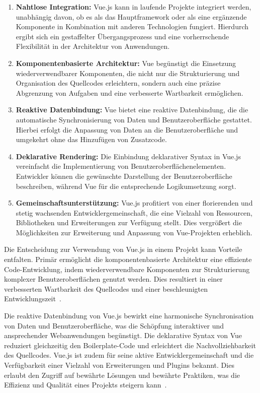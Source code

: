 \begin{enumerate}[itemsep=8pt, parsep=5pt]
    \item \textbf{Nahtlose Integration:} Vue.js kann  in laufende Projekte integriert werden, unabhängig davon,
ob es als das Hauptframework oder als eine ergänzende Komponente in Kombination mit anderen Technologien fungiert.
Hierdurch ergibt sich ein gestaffelter Übergangsprozess und eine vorherrschende Flexibilität in der Architektur von
Anwendungen.
    \item \textbf{Komponentenbasierte Architektur:} Vue begünstigt die Einsetzung wiederverwendbarer Komponenten, die
nicht nur die Strukturierung und Organisation des Quellcodes erleichtern, sondern auch eine präzise Abgrenzung von
Aufgaben und eine verbesserte Wartbarkeit ermöglichen.
    \item \textbf{Reaktive Datenbindung:} Vue bietet eine reaktive Datenbindung, die die automatische Synchronisierung
von Daten und Benutzeroberfläche gestattet. Hierbei erfolgt die Anpassung von Daten an die Benutzeroberfläche und
umgekehrt ohne das Hinzufügen von Zusatzcode.
    \item \textbf{Deklarative Rendering:} Die Einbindung deklarativer Syntax in Vue.js vereinfacht die Implementierung
von Benutzeroberflächenelementen. Entwickler können die gewünschte Darstellung der Benutzeroberfläche
beschreiben, während Vue für die entsprechende Logikumsetzung sorgt.
    \item \textbf{Gemeinschaftsunterstützung:} Vue.js profitiert von einer florierenden und stetig wachsenden
Entwicklergemeinschaft, die eine Vielzahl von Ressourcen, Bibliotheken und Erweiterungen zur Verfügung stellt. Dies
vergrößert die Möglichkeiten zur Erweiterung und Anpassung von Vue-Projekten erheblich.
\end{enumerate}

Die Entscheidung zur Verwendung von Vue.js in einem Projekt kann Vorteile entfalten. Primär ermöglicht
die komponentenbasierte Architektur eine effiziente Code-Entwicklung, indem wiederverwendbare Komponenten zur
Strukturierung komplexer Benutzeroberflächen genutzt werden. Dies resultiert in einer verbesserten Wartbarkeit des
Quellcodes und einer beschleunigten Entwicklungszeit~\cite{wohlgethan2018supportingweb}.

Die reaktive Datenbindung von Vue.js bewirkt eine harmonische Synchronisation von Daten und Benutzeroberfläche, was die
Schöpfung interaktiver und ansprechender Webanwendungen begünstigt. Die deklarative Syntax von Vue reduziert
gleichzeitig den Boilerplate-Code und erleichtert die Nachvollziehbarkeit des Quellcodes. Vue.js ist zudem für seine
aktive Entwicklergemeinschaft und die Verfügbarkeit einer Vielzahl von Erweiterungen und
Plugins bekannt. Dies erlaubt den Zugriff auf bewährte Lösungen und bewährte Praktiken, was die Effizienz und Qualität
eines Projekts steigern kann~\cite{wohlgethan2018supportingweb}.


